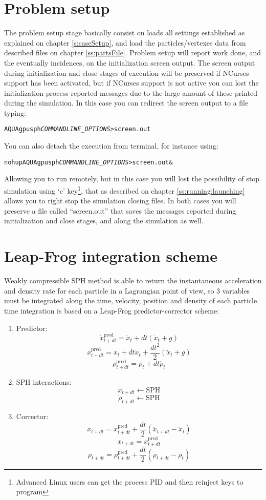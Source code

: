 \section{Problem setup}
\label{ss:aquagpusph:problemsetup}
%
The problem setup stage basically consist on loads all settings established as explained on chapter
\ref{s:caseSetup}, and load the particles/vertexes data from described files on chapter \ref{ss:partsFile}.\rc
%
Problem setup will report work done, and the eventually incidences, on the initialization screen output.
The screen output during initialization and close stages of \NAME execution will be preserved if NCurses
support has been activated, but if NCurses support is not active you can lost the initialization process
reported messages due to the large amount of these printed during the simulation. In this case you
can redirect the screen output to a file typing:
%
\begin{alltt}
AQUAgpusph \emph{COMMANDLINE_OPTIONS} > screen.out
\end{alltt}
%
You can also detach the execution from terminal, for instance using:
%
\begin{alltt}
nohup AQUAgpusph \emph{COMMANDLINE_OPTIONS} > screen.out &
\end{alltt}
%
Allowing you to run \NAME remotely, but in this case you will lost the possibility of stop simulation using `c'
key\footnote{Advanced Linux users can get the process PID and then reinject keys to program}, that as described
on chapter \ref{ss:running:launching} allows you to right stop the simulation closing files.\rc
%
In both cases you will preserve a file called ``screen.out'' that saves the messages reported during
initialization and close stages, and along the simulation as well.
%
\section{Leap-Frog integration scheme}
\label{ss:aquagpusph:leapfrog}
%
Weakly compressible SPH method is able to return the instantaneous acceleration and density rate for each
particle in a Lagrangian point of view, so 3 variables must be integrated along the time, velocity, position
and density of each particle. \NAME time integration is based on a Leap-Frog predictor-corrector scheme:
%
\begin{enumerate}
	\item Predictor:
	\[
	\dot x_{t+dt}^{\mathrm{pred}} = 
	\dot x_{t} + 
	dt \left(
		\ddot x_{t} + g
	\right)
	\]
	\[
	x_{t+dt}^{\mathrm{pred}} = 
	x_{t} + 
	dt \dot x_{t} + 
	\frac{dt^2}{2} \left(
		\ddot x_{t} + g
	\right)
	\]
	\[
	\rho_{t+dt}^{\mathrm{pred}} = 
	\rho_{t} + 
	dt \dot\rho_{t}
	\]
	\item SPH interactions:
	\[
	\ddot x_{t+dt} \leftarrow \mbox{SPH}
	\]
	\[
	\dot\rho_{t+dt} \leftarrow \mbox{SPH}
	\]
	\item Corrector:
	\[
	\dot x_{t+dt} = 
	\dot x_{t+dt}^{\mathrm{pred}} + 
	\frac{dt}{2} \left(
		\ddot x_{t+dt} - \ddot x_{t}
	\right)
	\]
	\[
	x_{t+dt} = x_{t+dt}^{\mathrm{pred}}
	\]
	\[
	\rho_{t+dt} = 
	\rho_{t+dt}^{\mathrm{pred}} + 
	\frac{dt}{2} \left(
		\dot\rho_{t+dt} - \dot\rho_{t}
	\right)
	\]
\end{enumerate}
%
